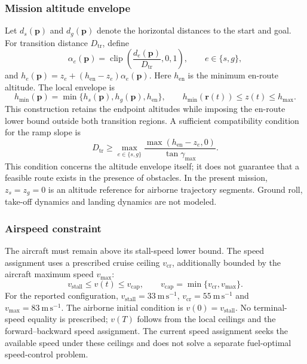 \documentclass[preprint,12pt]{elsarticle}
\begin{document}
\subsubsection{Mission altitude envelope}
Let $d_s(\mathbf{p})$ and $d_g(\mathbf{p})$ denote the horizontal distances
to the start and goal. For transition distance $D_{\mathrm{tr}}$, define
\begin{equation}
 \alpha_e(\mathbf{p})=\operatorname{clip}
 \left(\frac{d_e(\mathbf{p})}{D_{\mathrm{tr}}},0,1\right),
 \qquad e\in\{s,g\},
 \label{pr:eq:transition}
\end{equation}
and $h_e(\mathbf{p})=z_e+(h_{\mathrm{en}}-z_e)\alpha_e(\mathbf{p})$.
Here $h_{\mathrm{en}}$ is the minimum en-route altitude. The local envelope is
\begin{equation}
 h_{\min}(\mathbf{p})=\min\{h_s(\mathbf{p}),h_g(\mathbf{p}),h_{\mathrm{en}}\},
 \qquad h_{\min}(\mathbf{r}(t))\le z(t)\le h_{\max}.
 \label{pr:eq:altitude}
\end{equation}
This construction retains the endpoint altitudes while imposing the
en-route lower bound outside both transition regions. A sufficient
compatibility condition for the ramp slope is
\begin{equation}
 D_{\mathrm{tr}}\ge
 \max_{e\in\{s,g\}}\frac{\max(h_{\mathrm{en}}-z_e,0)}{\tan\gamma_{\max}}.
 \label{pr:eq:ramp}
\end{equation}
This condition concerns the altitude envelope itself; it does not guarantee
that a feasible route exists in the presence of obstacles. In the present
mission, $z_s=z_g=0$ is an altitude reference for airborne trajectory
segments. Ground roll, take-off dynamics and landing dynamics are not modeled.

\subsubsection{Airspeed constraint}
The aircraft must remain above its stall-speed lower bound. The speed
assignment uses a prescribed cruise ceiling $v_{\mathrm{cr}}$, additionally
bounded by the aircraft maximum speed $v_{\max}$:
\begin{equation}
 v_{\mathrm{stall}}\le v(t)\le v_{\mathrm{cap}},\qquad
 v_{\mathrm{cap}}=\min\{v_{\mathrm{cr}},v_{\max}\}.
 \label{pr:eq:speedcap}
\end{equation}
For the reported configuration, $v_{\mathrm{stall}}=33~\mathrm{m\,s^{-1}}$,
$v_{\mathrm{cr}}=55~\mathrm{m\,s^{-1}}$ and
$v_{\max}=83~\mathrm{m\,s^{-1}}$. The airborne initial condition is
$v(0)=v_{\mathrm{stall}}$. No terminal-speed equality is prescribed;
$v(T)$ follows from the local ceilings and the forward--backward speed
assignment. The current speed assignment seeks the available speed under
these ceilings and does not solve a separate fuel-optimal speed-control problem.
\end{document}
